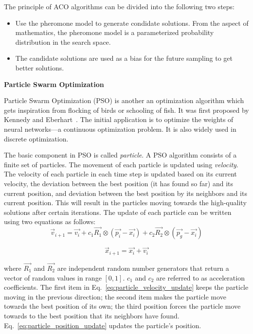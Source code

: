 The principle of ACO algorithms can be divided into the following two steps:

\begin{itemize}
\item Use the pheromone model to generate condidate solutions. From the aspect of mathematics, the pheromone model is a parameterized probability distribution in the search space.

\item The candidate solutions are used as a bias for the future sampling to get better solutions.
\end{itemize}

\textbf{Particle Swarm Optimization}

Particle Swarm Optimization (PSO) is another an optimization algorithm which gets inspiration from flocking of birds or schooling of fish. It was first proposed by Kennedy and Eberhart~\cite{Kennedy:ICNN:1995}. The initial application is to optimize the weights of neural networks---a continuous optimization problem. It is also widely used in discrete optimization. 

The basic component in PSO is called \textit{particle}. A PSO algorithm consists of a finite set of particles. The movement of each particle is updated using \textit{velocity}. The velocity of each particle in each time step is updated based on its current velocity, the deviation between the best position (it has found so far) and its current position, and deviation between the best position by its neighbors and its current position. This will result in the particles moving towards the high-quality solutions after certain iterations. The update of each particle can be written using two equations as follows:
\begin{equation}\label{eq:particle_velocity_update}
\overrightarrow{v}_{i+1} =  \overrightarrow{v_{i}} + c_1\overrightarrow{R_{1}}\otimes(\overrightarrow{p_{i}} - \overrightarrow{x_{i}}) + c_2\overrightarrow{R_{2}}\otimes(\overrightarrow{p_{g}} - \overrightarrow{x_{i}}) 
\end{equation} 

\begin{equation}\label{eq:particle_position_update}
\overrightarrow{x}_{i+1} =  \overrightarrow{x_{i}} + \overrightarrow{v_{i}}
\end{equation} 

where $\overrightarrow{R_{1}}$ and $\overrightarrow{R_{2}}$ are independent random number generators that return a vector of random values in range $[0, 1]$. $c_1$ and $c_2$ are referred to as acceleration coefficients. The first item in Eq.~\eqref{eq:particle_velocity_update} keeps the particle moving in the previous direction; the second item makes the particle move towards the best position of its own; the third position forces the particle move towards to the best position that its neighbors have found. Eq.~\eqref{eq:particle_position_update} updates the particle's position.  

